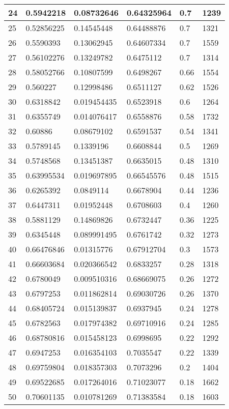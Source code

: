 \begin{longtable}{|l|l|l|l|l|l|}
24 & 0.5942218 & 0.08732646 & 0.64325964 & 0.7 & 1239 \\ \hline 
25 & 0.52856225 & 0.14545448 & 0.64488876 & 0.7 & 1321 \\ \hline 
26 & 0.5590393 & 0.13062945 & 0.64607334 & 0.7 & 1559 \\ \hline 
27 & 0.56102276 & 0.13249782 & 0.6475112 & 0.7 & 1314 \\ \hline 
28 & 0.58052766 & 0.10807599 & 0.6498267 & 0.66 & 1554 \\ \hline 
29 & 0.560227 & 0.12998486 & 0.6511127 & 0.62 & 1526 \\ \hline 
30 & 0.6318842 & 0.019454435 & 0.6523918 & 0.6 & 1264 \\ \hline 
31 & 0.6355749 & 0.014076417 & 0.6558876 & 0.58 & 1732 \\ \hline 
32 & 0.60886 & 0.08679102 & 0.6591537 & 0.54 & 1341 \\ \hline 
33 & 0.5789145 & 0.1339196 & 0.6608844 & 0.5 & 1269 \\ \hline 
34 & 0.5748568 & 0.13451387 & 0.6635015 & 0.48 & 1310 \\ \hline 
35 & 0.63995534 & 0.019697895 & 0.66545576 & 0.48 & 1515 \\ \hline 
36 & 0.6265392 & 0.0849114 & 0.6678904 & 0.44 & 1236 \\ \hline 
37 & 0.6447311 & 0.01952448 & 0.6708603 & 0.4 & 1260 \\ \hline 
38 & 0.5881129 & 0.14869826 & 0.6732447 & 0.36 & 1225 \\ \hline 
39 & 0.6345448 & 0.089991495 & 0.6761742 & 0.32 & 1273 \\ \hline 
40 & 0.66476846 & 0.01315776 & 0.67912704 & 0.3 & 1573 \\ \hline 
41 & 0.66603684 & 0.020366542 & 0.6833257 & 0.28 & 1318 \\ \hline 
42 & 0.6780049 & 0.009510316 & 0.68669075 & 0.26 & 1272 \\ \hline 
43 & 0.6797253 & 0.011862814 & 0.69030726 & 0.26 & 1370 \\ \hline 
44 & 0.68405724 & 0.015139837 & 0.6937945 & 0.24 & 1278 \\ \hline 
45 & 0.6782563 & 0.017974382 & 0.69710916 & 0.24 & 1285 \\ \hline 
46 & 0.68780816 & 0.015458123 & 0.6998695 & 0.22 & 1292 \\ \hline 
47 & 0.6947253 & 0.016354103 & 0.7035547 & 0.22 & 1339 \\ \hline 
48 & 0.69759804 & 0.018357303 & 0.7073296 & 0.2 & 1404 \\ \hline 
49 & 0.69522685 & 0.017264016 & 0.71023077 & 0.18 & 1662 \\ \hline 
50 & 0.70601135 & 0.010781269 & 0.71383584 & 0.18 & 1603 \\ \hline 
\end{longtable}